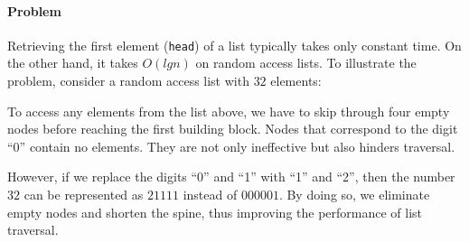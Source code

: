 \documentclass[\main/thesis.tex]{subfiles}
\begin{document}
\paragraph{Problem}

Retrieving the first element ({\lstinline|head|}) of a list typically takes
only constant time. On the other hand, it takes $ O(lg n) $ on random access lists.
To illustrate the problem, consider a random access list with $ 32 $ elements:

\begin{center}
\end{center}

To access any elements from the list above, we have to skip
through four empty nodes before reaching the first building block.
Nodes that correspond to the digit ``0'' contain no elements.
They are not only ineffective but also hinders traversal.

However, if we replace the digits ``0'' and ``1'' with ``1'' and ``2'',
then the number $ 32 $ can be represented as $ 21111 $ instead of $ 000001 $.
By doing so, we eliminate empty nodes and shorten the spine, thus improving
the performance of list traversal.
\end{document}
